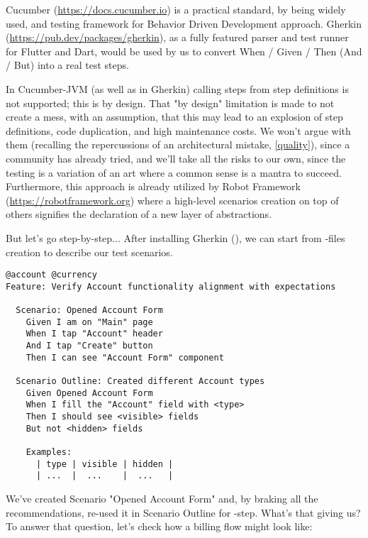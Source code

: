 Cucumber (\href{https://docs.cucumber.io}{https://docs.cucumber.io}) is a practical standard, by being widely used, 
and testing framework for Behavior Driven Development approach. Gherkin 
(\href{https://pub.dev/packages/gherkin}{https://pub.dev/packages/gherkin}), as a fully featured parser and 
test runner for Flutter and Dart, would be used by us to convert When / Given / Then (And / But) into a real test steps.

In Cucumber-JVM (as well as in Gherkin) calling steps from step definitions is not supported; this is by design. 
That "by design" limitation is made to not create a mess, with an assumption, that this may lead to an explosion of step 
definitions, code duplication, and high maintenance costs. We won't argue with them (recalling the repercussions of an 
architectural mistake, \ref{quality}), since a community has already tried, and we'll take all the risks to our own, 
since the testing is a variation of an art where a common sense is a mantra to succeed. Furthermore, this approach is 
already utilized by Robot Framework (\href{https://robotframework.org}{https://robotframework.org}) where a high-level 
scenarios creation on top of others signifies the declaration of a new layer of abstractions.

But let's go step-by-step... After installing Gherkin (), we can start from 
-files creation to describe our test scenarios.

\begin{lstlisting}[language=cucumber]
@account @currency
Feature: Verify Account functionality alignment with expectations

  Scenario: Opened Account Form
    Given I am on "Main" page
    When I tap "Account" header
    And I tap "Create" button
    Then I can see "Account Form" component

  Scenario Outline: Created different Account types
    Given Opened Account Form
    When I fill the "Account" field with <type>
    Then I should see <visible> fields
    But not <hidden> fields

    Examples: 
      | type | visible | hidden |
      | ...  |  ...    |  ...   |
\end{lstlisting}

\noindent We've created Scenario "Opened Account Form" and, by braking all the recommendations, re-used it in Scenario 
Outline for -step. What's that giving us? To answer that question, let's check how a billing flow might look 
like:

